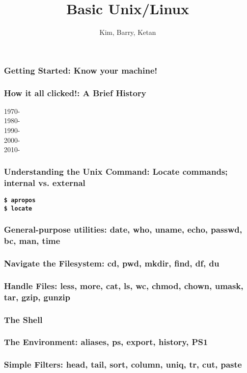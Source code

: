 \documentclass[hyperref={pdfpagelabels=false},12pt]{beamer}
\title[Basic Unix/Linux]{{Basic Unix/Linux}}
\author[Basic Unix/Linux]{{Kim, Barry, Ketan}}
\date{}
\newcommand{\cmd}[1] {\textbf{\texttt{\$ #1}}}
\begin{document}
\begin{frame}[plain]
\titlepage
\end{frame}

\begin{frame}
\frametitle{Getting Started: Know your machine!}


\end{frame}

\begin{frame}
\frametitle{How it all clicked!: A Brief History}

1970-\\
1980-\\
1990-\\
2000-\\
2010-\\

\end{frame}

\begin{frame}
\frametitle{Understanding the Unix Command: Locate commands; internal vs. external}
\cmd{apropos}\\
\cmd{locate}
\end{frame}

\begin{frame}
\frametitle{General-purpose utilities: date, who, uname, echo, passwd, bc, man, time}

\end{frame}

\begin{frame}
\frametitle{Navigate the Filesystem: cd, pwd, mkdir, find, df, du}

\end{frame}

\begin{frame}
\frametitle{Handle Files: less, more, cat, ls, wc, chmod, chown, umask, tar, gzip, gunzip}

\end{frame}

\begin{frame}
\frametitle{The Shell}
\end{frame}

\begin{frame}
\frametitle{The Environment: aliases, ps, export, history, PS1}


\end{frame}

\begin{frame}
\frametitle{Simple Filters: head, tail, sort, column, uniq, tr, cut, paste}


\end{frame}
\end{document}
